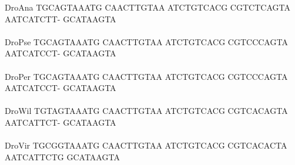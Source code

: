 \documentclass[11pt,twoside,reqno,a4paper]{article}
\begin{document}
{DroAna	TGCAGTAAATG	CAACTTGTAA	ATCTGTCACG	CGTCTCAGTA	AATCATCTT-	GCATAAGTA\\
\hspace*{7\charwidth}\hspace*{1\charwidth}\hspace*{1\charwidth}\hspace*{1\charwidth}\hspace*{1\charwidth}\hspace*{1\charwidth}\\
DroPse	TGCAGTAAATG	CAACTTGTAA	ATCTGTCACG	CGTCCCAGTA	AATCATCCT-	GCATAAGTA\\
\hspace*{7\charwidth}\hspace*{1\charwidth}\hspace*{1\charwidth}\hspace*{1\charwidth}\hspace*{1\charwidth}\hspace*{1\charwidth}\\
DroPer	TGCAGTAAATG	CAACTTGTAA	ATCTGTCACG	CGTCCCAGTA	AATCATCCT-	GCATAAGTA\\
\hspace*{7\charwidth}\hspace*{1\charwidth}\hspace*{1\charwidth}\hspace*{1\charwidth}\hspace*{1\charwidth}\hspace*{1\charwidth}\\
DroWil	TGTAGTAAATG	CAACTTGTAA	ATCTGTCACG	CGTCACAGTA	AATCATTCT-	GCATAAGTA\\
\hspace*{7\charwidth}\hspace*{1\charwidth}\hspace*{1\charwidth}\hspace*{1\charwidth}\hspace*{1\charwidth}\hspace*{1\charwidth}\\
DroVir	TGCGGTAAATG	CAACTTGTAA	ATCTGTCACG	CGTCACACTA	AATCATTCTG	GCATAAGTA\\
\hspace*{7\charwidth}\hspace*{1\charwidth}\hspace*{1\charwidth}\hspace*{1\charwidth}\hspace*{1\charwidth}\hspace*{1\charwidth}\\
}
\end{document}
